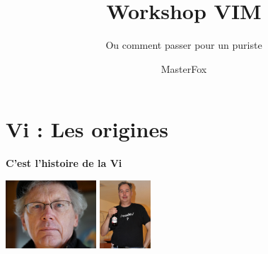 \documentclass[10pt]{beamer}
\title{Workshop VIM}
\subtitle{Ou comment passer pour un puriste}
\author{MasterFox}
\begin{document}
	  \maketitle

		\section{Vi : Les origines}
			\begin{frame}{\textbf{C'est l'histoire de la Vi}}

				\center
				\includegraphics[height=96]{img/bill-joy.jpeg}
				\includegraphics[height=96]{img/bram-moolenaar.jpg}
				

\end{frame}
\end{document}
